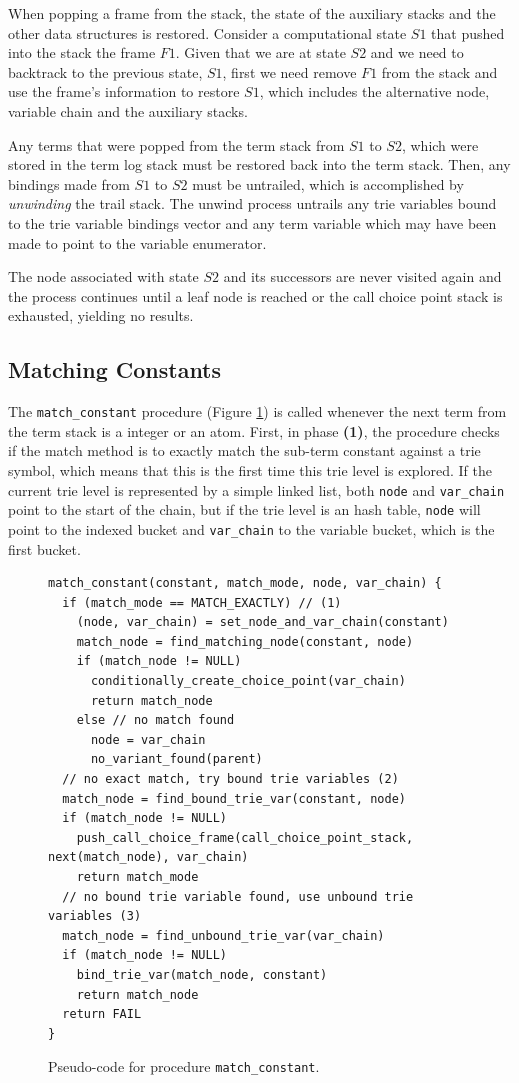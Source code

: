 When popping a frame from the stack, the state of the auxiliary stacks and the other data
structures is restored. Consider a computational state $S1$ that pushed into the stack
the frame $F1$. Given that we are at state $S2$ and we need to backtrack to the previous state, $S1$,
first we need remove $F1$ from the stack and use the frame's information to restore $S1$,
which includes the alternative node, variable chain and the auxiliary stacks.

Any terms that were popped from the term stack from $S1$ to $S2$, which were
stored in the term log stack must be restored back into the term stack.
Then, any bindings made from $S1$ to $S2$ must be untrailed, which is
accomplished by \textit{unwinding} the trail stack. The unwind process untrails
any trie variables bound to the trie variable bindings vector
and any term variable which may have been made to point to the variable enumerator.

The node associated with state $S2$ and its successors are never visited again and
the process continues until a leaf node is reached or the call choice point stack
is exhausted, yielding no results.

\subsection{Matching Constants}

The \texttt{match\_constant} procedure (Figure \ref{fig:match_constant}) is called whenever the
next term from the term stack is a integer or an atom.
First, in phase \textbf{(1)}, the procedure checks if the match method is to exactly match the
sub-term constant against a trie symbol, which means
that this is the first time this trie level is explored. If the current trie level is represented by a simple
linked list, both \texttt{node} and \texttt{var\_chain} point to the start of the chain, but if the trie level
is an hash table, \texttt{node} will point to the indexed bucket and \texttt{var\_chain} to the variable
bucket, which is the first bucket.

\begin{figure}[ht]
\begin{Verbatim}
match_constant(constant, match_mode, node, var_chain) {
  if (match_mode == MATCH_EXACTLY) // (1)
    (node, var_chain) = set_node_and_var_chain(constant)
    match_node = find_matching_node(constant, node)
    if (match_node != NULL)
      conditionally_create_choice_point(var_chain)
      return match_node
    else // no match found
      node = var_chain
      no_variant_found(parent)
  // no exact match, try bound trie variables (2)
  match_node = find_bound_trie_var(constant, node)
  if (match_node != NULL)
    push_call_choice_frame(call_choice_point_stack, next(match_node), var_chain)
    return match_mode
  // no bound trie variable found, use unbound trie variables (3)
  match_node = find_unbound_trie_var(var_chain)
  if (match_node != NULL)
    bind_trie_var(match_node, constant)
    return match_node
  return FAIL
}
\end{Verbatim}
\caption{Pseudo-code for procedure \texttt{match\_constant}.}
\label{fig:match_constant}
\end{figure}

